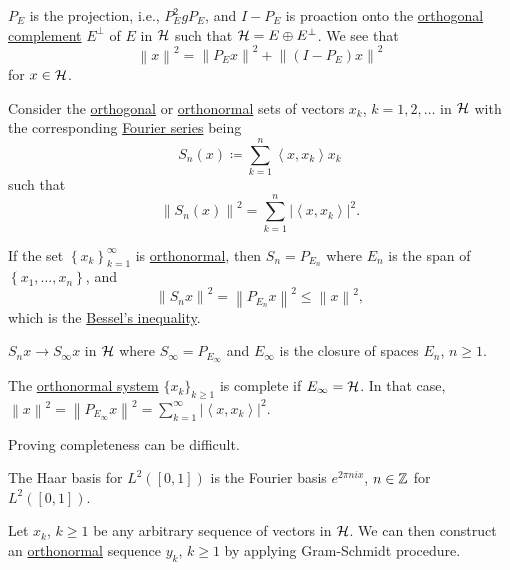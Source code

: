 \begin{remark}
	\(P_E\) is the projection, i.e., \(P_E ^{2} g P_E\), and \(I-P_E\) is proaction onto the \hyperref[def:orthogonal-complement]{orthogonal complement} \(E^\perp\) of \(E\) in \(\mathcal{\MakeUppercase{h}} \) such that \(\mathcal{\MakeUppercase{h}} = E \oplus E^{\perp} \). We see that
	\[
		\left\lVert x\right\rVert ^{2} = \left\lVert P_E x\right\rVert ^{2} + \left\lVert (I - P_E)x\right\rVert ^{2}
	\]
	for \(x\in \mathcal{\MakeUppercase{h}} \).
\end{remark}

Consider the \hyperref[def:orthogonal-system]{orthogonal} or \hyperref[def:orthonormal-system]{orthonormal} sets of vectors \(x_k\), \(k = 1, 2, \ldots  \) in \(\mathcal{\MakeUppercase{h}} \) with the corresponding \hyperref[def:Fourier-series]{Fourier series} being
\[
	S_n(x) \coloneqq \sum_{k=1} ^n \left\langle x, x_k \right\rangle x_k
\]
such that
\[
	\left\lVert S_n(x)\right\rVert ^{2} = \sum_{k=1}^n \left\vert \left\langle x, x_k \right\rangle  \right\vert ^{2}.
\]

If the set \(\left\{ x_k \right\} _{k=1}^{\infty} \) is \hyperref[def:orthonormal-system]{orthonormal}, then \(S_n = P_{E_n}\) where \(E_n\) is the span of \(\left\{ x_1, \ldots , x_n  \right\} \), and
\[
	\left\lVert S_n x\right\rVert ^{2} = \left\lVert P_{E_n}x\right\rVert ^{2} \leq \left\lVert x\right\rVert ^{2},
\]
which is the \hyperref[thm:Bessel-ineq]{Bessel's inequality}.

\begin{remark}
	\(S_n x \to S_\infty x\) in \(\mathcal{\MakeUppercase{h}} \) where \(S_\infty = P_{E_\infty }\) and \(E_\infty \) is the closure of spaces \(E_n\), \(n \geq 1\).
\end{remark}

The \hyperref[def:orthonormal-system]{orthonormal system} \(\{x_k\}_{k \geq 1}\) is complete if \(E_\infty = \mathcal{\MakeUppercase{h}}\). In that case, \(\left\lVert x\right\rVert ^{2} = \left\lVert P_{E_\infty }x\right\rVert ^{2} = \sum_{k=1}^{\infty} \left\vert \left\langle x, x_k \right\rangle  \right\vert ^{2} \).

\begin{remark}
	Proving completeness can be difficult.
\end{remark}

\begin{eg}
	The Haar basis for \(L^2([0, 1])\) is the Fourier basis \(e^{2\pi ni x}\), \(n \in \mathbb{\MakeUppercase{z}} \) for \(L^2([0, 1])\).
\end{eg}
\begin{explanation}
	Let \(x_k\), \(k \geq 1\) be any arbitrary sequence of vectors in \(\mathcal{\MakeUppercase{h}} \). We can then construct an \hyperref[def:orthonormal-system]{orthonormal} sequence \(y_k\), \(k \geq 1\) by applying Gram-Schmidt procedure.
\end{explanation}

